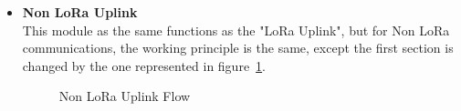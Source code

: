 \begin{itemize}
   \item \textbf{Non LoRa Uplink} \\
    This module as the same functions as the "LoRa Uplink", but for Non LoRa communications, the working principle is the same, except the first section is changed by the one represented in figure~\ref{fig:Non_LoRA_Up}.
    
    \begin{figure}[htbp]
      
      \centering
      \caption{Non LoRa Uplink Flow}
      \label{fig:Non_LoRA_Up}
    \end{figure}

\end{itemize}

